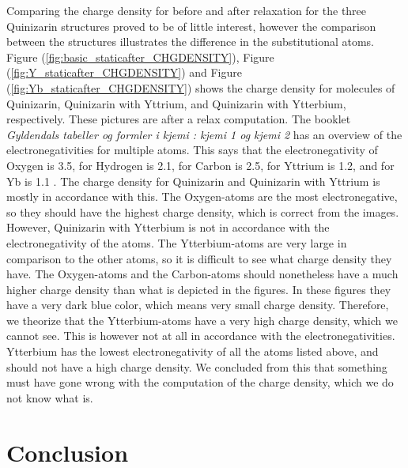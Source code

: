 \documentclass{article}
\begin{document}
    Comparing the charge density for before and after relaxation for the three Quinizarin structures proved to be of little interest, however the comparison between the structures illustrates the difference in the substitutional atoms. Figure (\ref{fig:basic_staticafter_CHGDENSITY}), Figure (\ref{fig:Y_staticafter_CHGDENSITY}) and Figure (\ref{fig:Yb_staticafter_CHGDENSITY}) shows the charge density for molecules of Quinizarin, Quinizarin with Yttrium, and Quinizarin with Ytterbium, respectively. These pictures are after a relax computation. The booklet \textit{Gyldendals tabeller og formler i kjemi : kjemi 1 og kjemi 2} has an overview of the electronegativities for multiple atoms. This says that the electronegativity of Oxygen is 3.5, for Hydrogen is 2.1, for Carbon is 2.5, for Yttrium is 1.2, and for Yb is 1.1 \cite{kjemibok}. The charge density for Quinizarin and Quinizarin with Yttrium is mostly in accordance with this. The Oxygen-atoms are the most electronegative, so they should have the highest charge density, which is correct from the images. However, Quinizarin with Ytterbium is not in accordance with the electronegativity of the atoms. The Ytterbium-atoms are very large in comparison to the other atoms, so it is difficult to see what charge density they have. The Oxygen-atoms and the Carbon-atoms should nonetheless have a much higher charge density than what is depicted in the figures. In these figures they have a very dark blue color, which means very small charge density. Therefore, we theorize that the Ytterbium-atoms have a very high charge density, which we cannot see. This is however not at all in accordance with the electronegativities. Ytterbium has the lowest electronegativity of all the atoms listed above, and should not have a high charge density. We concluded from this that something must have gone wrong with the computation of the charge density, which we do not know what is. \\

\vspace{1cm}

\section{Conclusion}    \label{sec:Conclusion}
\end{document}
